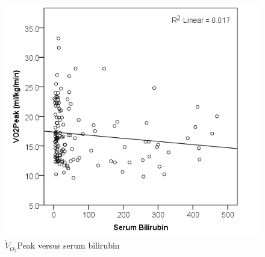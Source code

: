 \documentclass[10pt]{beamer}
\begin{document}
\begin{frame}
\begin{columns}[t]
		\begin{figure}
			\includegraphics[width=\textwidth]{../Figures/cpet_oj_scatter_peak_bil}
			\\ $\dot{V}_{O_2}$Peak versus serum bilirubin
		\end{figure}
	\end{columns}
\end{frame}
\end{document}
